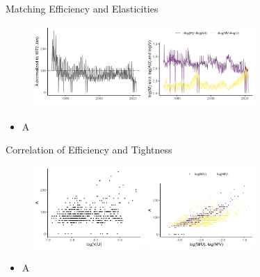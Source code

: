 \documentclass[aspectratio=169]{beamer}
\begin{document}
\begin{frame}{Matching Efficiency and Elasticities}
    \begin{figure}[!ht]
  \begin{center}
  \includegraphics[width = 0.37\textwidth]
  {figuretable/matching_efficiency_month_aggregate.png}
  \includegraphics[width = 0.37\textwidth]
  {figuretable/elasticity_month_aggregate.png}
  \end{center}
  \footnotesize
\end{figure} 
\begin{itemize}
    \item A
\end{itemize}
\end{frame}

\begin{frame}{Correlation of Efficiency and Tightness}
    \begin{figure}[!ht]
  \begin{center}
  \includegraphics[width = 0.37\textwidth]
  {figuretable/efficiency_tightness_plot_month_aggregate.png}
  \includegraphics[width = 0.37\textwidth]
  {figuretable/job_finding_rate_efficiency_plot_month_aggregate.png}
  \end{center}
  \footnotesize
\end{figure} 
\begin{itemize}
    \item A
\end{itemize}
\end{frame}
\end{document}
